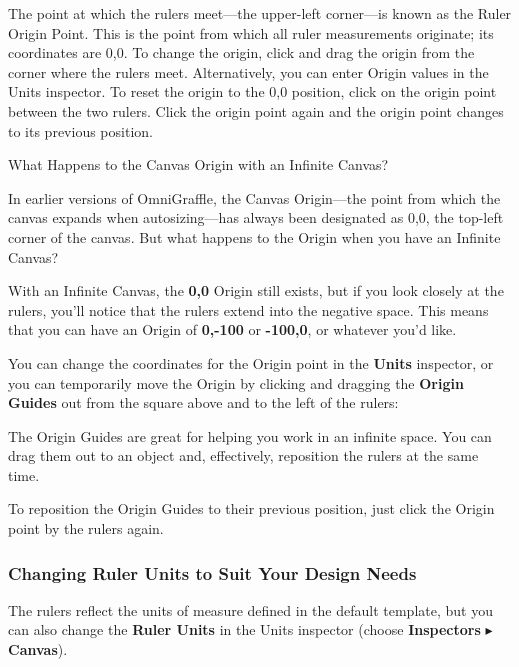 \documentclass[../main.tex]{subfiles}
\begin{document}
The point at which the rulers meet—the upper-left corner—is known as the Ruler Origin Point.
This is the
point from which all ruler measurements originate; its coordinates are 0,0.
To change the origin, click and drag the origin from the corner where the rulers meet.
Alternatively, you can
enter Origin values in the Units inspector. To reset the origin to the 0,0 position, click on
the origin
point between the two rulers. Click the origin point again and the origin point changes to its
previous position.

\begin{ogsidebar}
  What Happens to the Canvas Origin with an Infinite Canvas?

  In earlier versions of OmniGraffle, the Canvas Origin—the point from which the canvas expands
  when
  autosizing—has always been designated as 0,0, the top-left corner of the canvas. But what
  happens to the
  Origin when you have an Infinite Canvas?

  With an Infinite Canvas, the \textbf{0,0} Origin still exists, but if you look closely at the
  rulers, you'll notice
  that the rulers extend into the negative space. This means that you can have an Origin of
  \textbf{0,-100}
  or \textbf{-100,0},
  or whatever you'd like.

  You can change the coordinates for the Origin point in the \textbf{Units} inspector, or you
  can temporarily move the
  Origin by clicking and dragging the \textbf{Origin Guides} out from the square above and to
  the left of the rulers:

  The Origin Guides are great for helping you work in an infinite space. You can drag them out
  to an object
  and, effectively, reposition the rulers at the same time.

  To reposition the Origin Guides to their previous position, just click the Origin point by the
  rulers again.
\end{ogsidebar}

\subsubsection{Changing Ruler Units to Suit Your Design Needs}
The rulers reflect the units of measure defined in the default template, but you can also change
the \textbf{Ruler
Units} in the Units inspector (choose \textbf{Inspectors} $\blacktriangleright$
\textbf{Canvas}).
\end{document}
